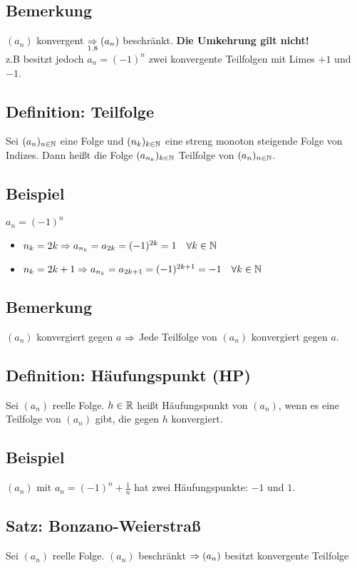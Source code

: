 \documentclass[10pt,a4paper]{article}
\begin{document}
    \subsection{Bemerkung}
    $(a_n)$ konvergent $\underset{1.8}{\Rightarrow} (a_n)$ beschränkt.
    \textbf{Die Umkehrung gilt nicht!} \\
    z.B besitzt jedoch $a_n = (-1)^n$ zwei konvergente Teilfolgen mit Limes $+1$ und $-1$.

    \subsection{Definition: Teilfolge}
    Sei $(a_n)_{n \in \mathbb{N}}$ eine Folge und $(n_k)_{k \in \mathbb{N}}$ eine streng monoton steigende Folge
    von Indizes. Dann heißt die Folge $(a_{n_k})_{k \in \mathbb{N}}$ Teilfolge von $(a_n)_{n \in \mathbb{N}}$.

    \subsection{Beispiel}
    $a_n = (-1)^n$
    \begin{itemize}
        \item $n_k = 2k \Rightarrow a_{n_k} = a_{2k} = (-1)^{2k} = 1 \quad \forall k \in \mathbb{N}$
        \item $n_k = 2k + 1 \Rightarrow a_{n_k} = a_{2k + 1} = (-1)^{2k + 1} = -1 \quad \forall k \in \mathbb{N}$
    \end{itemize}

    \subsection{Bemerkung}
    $(a_n)$ konvergiert gegen $a$
    $\Rightarrow$ Jede Teilfolge von $(a_n)$ konvergiert gegen $a$.

    \subsection{Definition: Häufungspunkt (HP)}
    Sei $(a_n)$ reelle Folge. $h \in \mathbb{R}$ heißt Häufungspunkt von $(a_n)$, wenn es eine
    Teilfolge von $(a_n)$ gibt, die gegen $h$ konvergiert.

    \subsection{Beispiel}
    $(a_n)$ mit $a_n = (-1)^n + \frac{1}{n}$ hat zwei Häufungspunkte: $-1$ und $1$.

    \subsection{Satz: Bonzano-Weierstraß}
    Sei $(a_n)$ reelle Folge.
    $(a_n)$ beschränkt $\Rightarrow (a_n)$ besitzt konvergente Teilfolge
\end{document}
